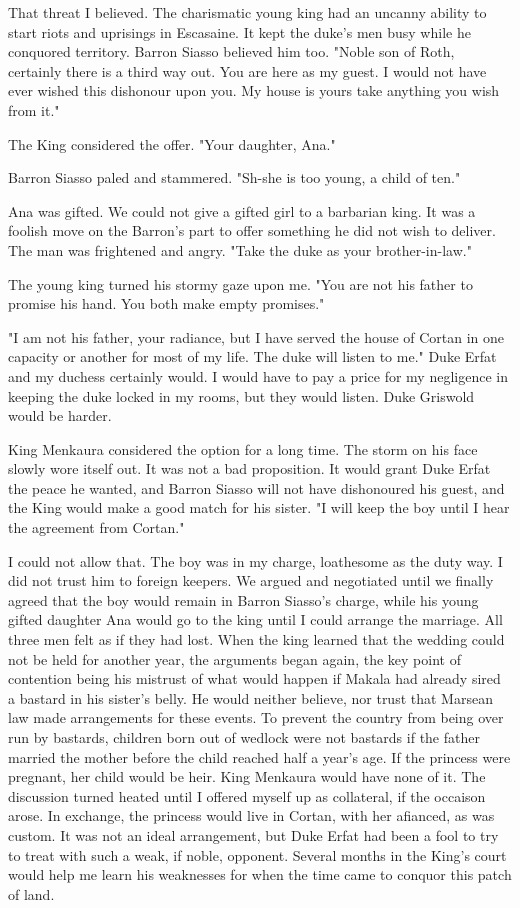 \documentclass{article}
\begin{document}
That threat I believed. The charismatic young king had an uncanny ability to start riots and uprisings in Escasaine. It kept the duke's men busy while he conquored territory. Barron Siasso believed him too. "Noble son of Roth, certainly there is a third way out. You are here as my guest. I would not have ever wished this dishonour upon you. My house is yours take anything you wish from it."

The King considered the offer. "Your daughter, Ana."

Barron Siasso paled and stammered. "Sh-she is too young,  a child of ten."

Ana was gifted. We could not give a gifted girl to a barbarian king. It was a foolish move on the Barron's part to offer something he did not wish to deliver. The man was frightened and angry. "Take the duke as your brother-in-law."

The young king turned his stormy gaze upon me. "You are not his father to promise his hand. You both make empty promises."

"I am not his father, your radiance, but I have served the house of Cortan in one capacity or another for most of my life. The duke will listen to me." Duke Erfat and my duchess certainly would. I would have to pay a price for my negligence in keeping the duke locked in my rooms, but they would listen. Duke Griswold would be harder. 

King Menkaura considered the option for a long time. The storm on his face slowly wore itself out. It was not a bad proposition. It would grant Duke Erfat the peace he wanted, and Barron Siasso will not have dishonoured his guest, and the King would make a good match for his sister. "I will keep the boy until I hear the agreement from Cortan."

I could not allow that. The boy was in my charge, loathesome as the duty way. I did not trust him to foreign keepers. We argued and negotiated until we finally agreed that the boy would remain in Barron Siasso's charge, while his young gifted daughter Ana would go to the king until I could arrange the marriage. All three men felt as if they had lost. When the king learned that the wedding could not be held for another year, the arguments began again, the key point of contention being his mistrust of what would happen if Makala had already sired a bastard in his sister's belly. He would neither believe, nor trust that Marsean law made arrangements for these events. To prevent the country from being over run by bastards, children born out of wedlock were not bastards if the father married the mother before the child reached half a year's age. If the princess were pregnant, her child would be heir. King Menkaura would have none of it. The discussion turned heated until I offered myself up as collateral, if the occaison arose. In exchange, the princess would live in Cortan, with her afianced, as was custom. It was not an ideal arrangement, but Duke Erfat had been a fool to try to treat with such a weak, if noble, opponent. Several months in the King's court would help me learn his weaknesses for when the time came to conquor this patch of land.
\end{document}
